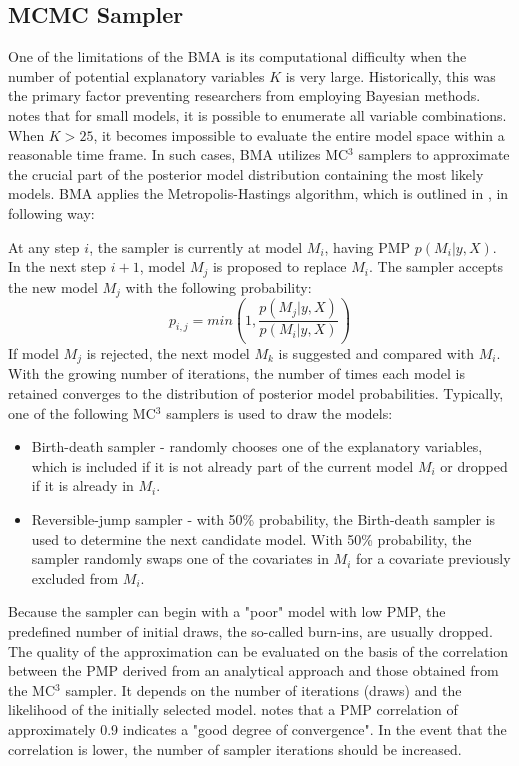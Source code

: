 \begin{refsection}
\subsection{\ac{MCMC} Sampler}
\label{ch2sec:mc3}
One of the limitations of the \ac{BMA} is its computational difficulty when the number of potential explanatory variables $K$ is very large. Historically, this was the primary factor preventing researchers from employing Bayesian methods. \textcite{Zeugner2011} notes that for small models, it is possible to enumerate all variable combinations. When $K > 25$, it becomes impossible to evaluate the entire model space within a reasonable time frame. In such cases, \ac{BMA} utilizes MC$^{3}$ samplers to approximate the crucial part of the posterior model distribution containing the most likely models. \ac{BMA} applies the Metropolis-Hastings algorithm, which is outlined in \textcite{Zeugner2011}, in following way:

At any step $i$, the sampler is currently at model $M_{i}$, having \ac{PMP} $p(M_{i} \vert y,X)$. In the next step $i+1$, model $M_{j}$ is proposed to replace $M_{i}$. The sampler accepts the new model $M_{j}$ with the following probability:
\begin{equation}\label{ch2eq:sampler}
	p_{i,j} = min \left( 1, \frac{p(M_{j} \vert y,X)}{p(M_{i} \vert y,X)}\right)
\end{equation}
If model $M_{j}$ is rejected, the next model $M_{k}$ is suggested and compared with $M_{i}$. With the growing number of iterations, the number of times each model is retained converges to the distribution of posterior model probabilities. Typically, one of the following MC$^{3}$ samplers is used to draw the models:
%
\begin{itemize}
	\item{Birth-death sampler - randomly chooses one of the explanatory variables, which is included if it is not already part of the current model $M_{i}$ or dropped if it is already in $M_{i}$.}
	\item{Reversible-jump sampler - with 50\% probability, the Birth-death sampler is used to determine the next candidate model. With 50\% probability, the sampler randomly swaps one of the covariates in $M_{i}$ for a covariate previously excluded from $M_{i}$.}
\end{itemize}
%
Because the sampler can begin with a "poor" model with low \ac{PMP}, the predefined number of initial draws, the so-called burn-ins, are usually dropped. The quality of the approximation can be evaluated on the basis of the correlation between the \ac{PMP} derived from an analytical approach and those obtained from the MC$^{3}$ sampler. It depends on the number of iterations (draws) and the likelihood of the initially selected model. \textcite{Zeugner2011} notes that a \ac{PMP} correlation of approximately 0.9 indicates a "good degree of convergence". In the event that the correlation is lower, the number of sampler iterations should be increased. 
%
%
%
%
%

\end{refsection}
